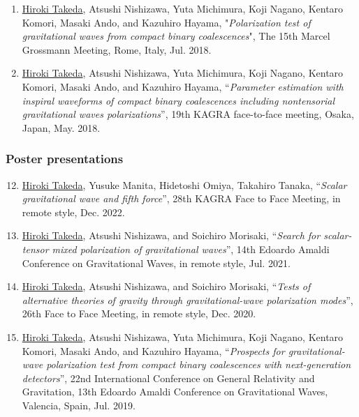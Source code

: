 \documentclass[uplatex, 12pt]{article}
\begin{document}
\begin{enumerate}
\item \uline{Hiroki Takeda}, Atsushi Nishizawa, Yuta Michimura, Koji Nagano, Kentaro Komori, Masaki Ando, and Kazuhiro Hayama, "\emph{Polarization test of gravitational waves from compact binary coalescences}", The 15th Marcel Grossmann Meeting, Rome, Italy, Jul. 2018.\\

\item \uline{Hiroki Takeda}, Atsushi Nishizawa, Yuta Michimura, Koji Nagano, Kentaro Komori, Masaki Ando, and Kazuhiro Hayama, “\emph{Parameter estimation with inspiral waveforms of compact binary coalescences including nontensorial gravitational waves polarizations}”, 19th KAGRA face-to-face meeting, Osaka, Japan, May. 2018.
\end{enumerate}

\subsubsection*{Poster presentations}

\begin{enumerate}
\setcounter{enumi}{11}
\item \uline{Hiroki Takeda}, Yusuke Manita, Hidetoshi Omiya, Takahiro Tanaka, “\emph{Scalar gravitational wave and fifth force}”, 28th KAGRA Face to Face Meeting, in remote style, Dec. 2022.\\

\item \uline{Hiroki Takeda}, Atsushi Nishizawa, and Soichiro Morisaki, “\emph{Search for scalar-tensor mixed polarization of gravitational waves}”, 14th Edoardo Amaldi Conference on Gravitational Waves, in remote style, Jul. 2021.\\

\item \uline{Hiroki Takeda}, Atsushi Nishizawa, and Soichiro Morisaki, “\emph{Tests of alternative theories of gravity through gravitational-wave polarization modes}”, 26th Face to Face Meeting, in remote style, Dec. 2020.\\

\item \uline{Hiroki Takeda}, Atsushi Nishizawa, Yuta Michimura, Koji Nagano, Kentaro Komori, Masaki Ando, and Kazuhiro Hayama, “\emph{Prospects for gravitational-wave polarization test from compact binary coalescences with next-generation detectors}”, 22nd International Conference on General Relativity and Gravitation, 13th Edoardo Amaldi Conference on Gravitational Waves, Valencia, Spain, Jul. 2019.\\

\end{enumerate}
\end{document}
